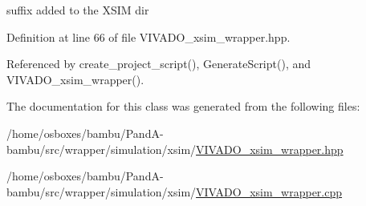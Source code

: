 suffix added to the X\+S\+IM dir 



Definition at line 66 of file V\+I\+V\+A\+D\+O\+\_\+xsim\+\_\+wrapper.\+hpp.



Referenced by create\+\_\+project\+\_\+script(), Generate\+Script(), and V\+I\+V\+A\+D\+O\+\_\+xsim\+\_\+wrapper().



The documentation for this class was generated from the following files\+:\begin{DoxyCompactItemize}
\item 
/home/osboxes/bambu/\+Pand\+A-\/bambu/src/wrapper/simulation/xsim/\hyperlink{VIVADO__xsim__wrapper_8hpp}{V\+I\+V\+A\+D\+O\+\_\+xsim\+\_\+wrapper.\+hpp}\item 
/home/osboxes/bambu/\+Pand\+A-\/bambu/src/wrapper/simulation/xsim/\hyperlink{VIVADO__xsim__wrapper_8cpp}{V\+I\+V\+A\+D\+O\+\_\+xsim\+\_\+wrapper.\+cpp}\end{DoxyCompactItemize}
